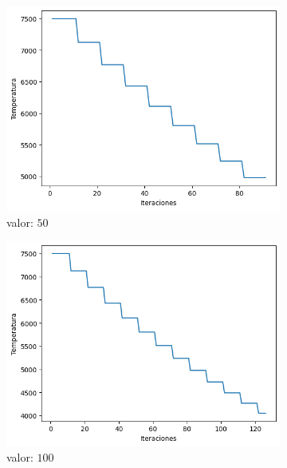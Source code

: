 \documentclass[a4paper,12pt]{article}
\begin{document}
	\begin{figure}[H]
		\centering
		\begin{subfigure}{0.24\textwidth}
			\centering
			\includegraphics[width=\textwidth]{include/parada/50/temp.png}
			\caption{valor: $50$}
		\end{subfigure}
		\hfill
		\begin{subfigure}{0.24\textwidth}
			\centering
			\includegraphics[width=\textwidth]{include/parada/100/temp.png}
			\caption{valor: $100$}
		\end{subfigure}
		\hfill
		\begin{subfigure}{0.24\textwidth}
			\centering

\end{subfigure}
\end{figure}
\end{document}
